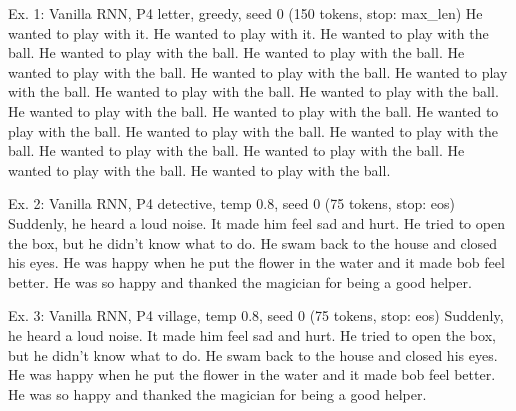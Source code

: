 \begin{modelout}{Ex. 1: Vanilla RNN, P4 letter, greedy, seed 0 (150 tokens, stop: max\_len)}
\small He wanted to play with it. He wanted to play with it. He wanted to play with the ball. He wanted to play with the ball. He wanted to play with the ball. He wanted to play with the ball. He wanted to play with the ball. He wanted to play with the ball. He wanted to play with the ball. He wanted to play with the ball. He wanted to play with the ball. He wanted to play with the ball. He wanted to play with the ball. He wanted to play with the ball. He wanted to play with the ball. He wanted to play with the ball. He wanted to play with the ball. He wanted to play with the ball. He wanted to play with the ball.
\end{modelout}

\begin{modelout}{Ex. 2: Vanilla RNN, P4 detective, temp 0.8, seed 0 (75 tokens, stop: eos)}
\small Suddenly, he heard a loud noise. It made him feel sad and hurt. He tried to open the box, but he didn't know what to do. He swam back to the house and closed his eyes. He was happy when he put the flower in the water and it made bob feel better. He was so happy and thanked the magician for being a good helper.
\end{modelout}

\begin{modelout}{Ex. 3: Vanilla RNN, P4 village, temp 0.8, seed 0 (75 tokens, stop: eos)}
\small Suddenly, he heard a loud noise. It made him feel sad and hurt. He tried to open the box, but he didn't know what to do. He swam back to the house and closed his eyes. He was happy when he put the flower in the water and it made bob feel better. He was so happy and thanked the magician for being a good helper.
\end{modelout}

